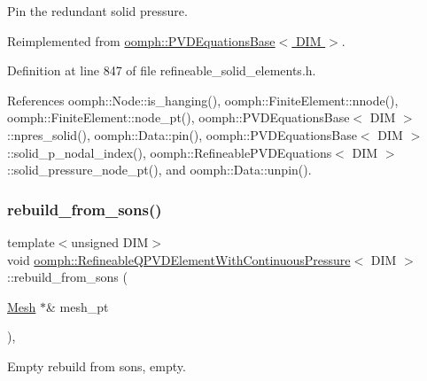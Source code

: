 Pin the redundant solid pressure. 



Reimplemented from \hyperlink{classoomph_1_1PVDEquationsBase_a1e0c99884cc3bad93209bcd19b415fd7}{oomph\+::\+P\+V\+D\+Equations\+Base$<$ D\+I\+M $>$}.



Definition at line 847 of file refineable\+\_\+solid\+\_\+elements.\+h.



References oomph\+::\+Node\+::is\+\_\+hanging(), oomph\+::\+Finite\+Element\+::nnode(), oomph\+::\+Finite\+Element\+::node\+\_\+pt(), oomph\+::\+P\+V\+D\+Equations\+Base$<$ D\+I\+M $>$\+::npres\+\_\+solid(), oomph\+::\+Data\+::pin(), oomph\+::\+P\+V\+D\+Equations\+Base$<$ D\+I\+M $>$\+::solid\+\_\+p\+\_\+nodal\+\_\+index(), oomph\+::\+Refineable\+P\+V\+D\+Equations$<$ D\+I\+M $>$\+::solid\+\_\+pressure\+\_\+node\+\_\+pt(), and oomph\+::\+Data\+::unpin().

\mbox{\label{classoomph_1_1RefineableQPVDElementWithContinuousPressure_a1a0d400c3d74157cacca3f3329a07436}} 
\subsubsection{\texorpdfstring{rebuild\+\_\+from\+\_\+sons()}{rebuild\_from\_sons()}}
{\footnotesize\ttfamily template$<$unsigned D\+IM$>$ \\
void \hyperlink{classoomph_1_1RefineableQPVDElementWithContinuousPressure}{oomph\+::\+Refineable\+Q\+P\+V\+D\+Element\+With\+Continuous\+Pressure}$<$ D\+IM $>$\+::rebuild\+\_\+from\+\_\+sons (\begin{DoxyParamCaption}\item[{\hyperlink{classoomph_1_1Mesh}{Mesh} $\ast$\&}]{mesh\+\_\+pt }\end{DoxyParamCaption})\hspace{0.3cm}{\ttfamily [inline]}, {\ttfamily [virtual]}}



Empty rebuild from sons, empty. 



